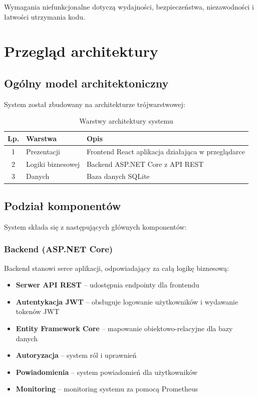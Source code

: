 \documentclass[times]{san}
\begin{document}
Wymagania niefunkcjonalne dotyczą wydajności, bezpieczeństwa, niezawodności i łatwości utrzymania kodu.

\section{Przegląd architektury}

\subsection{Ogólny model architektoniczny}

System został zbudowany na architekturze trójwarstwowej:

\begin{table}[h]
\centering
\caption{Warstwy architektury systemu}
\label{tab:architecture}
\begin{tabular}{|c|l|p{6cm}|}
\hline
Lp. & Warstwa & Opis \\
\hline
1   & Prezentacji & Frontend React aplikacja działająca w przeglądarce \\ 
2   & Logiki biznesowej & Backend ASP.NET Core z API REST \\
3   & Danych & Baza danych SQLite \\
\hline
\end{tabular}
\end{table}

\subsection{Podział komponentów}

System składa się z następujących głównych komponentów:

\subsubsection{Backend (ASP.NET Core)}

Backend stanowi serce aplikacji, odpowiadający za całą logikę biznesową:

\begin{itemize}
    \item \textbf{Serwer API REST} -- udostępnia endpointy dla frontendu
    \item \textbf{Autentykacja JWT} -- obsługuje logowanie użytkowników i wydawanie tokenów JWT
    \item \textbf{Entity Framework Core} -- mapowanie obiektowo-relacyjne dla bazy danych
    \item \textbf{Autoryzacja} -- system ról i uprawnień
    \item \textbf{Powiadomienia} -- system powiadomień dla użytkowników
    \item \textbf{Monitoring} -- monitoring systemu za pomocą Prometheus
\end{itemize}
\end{document}

